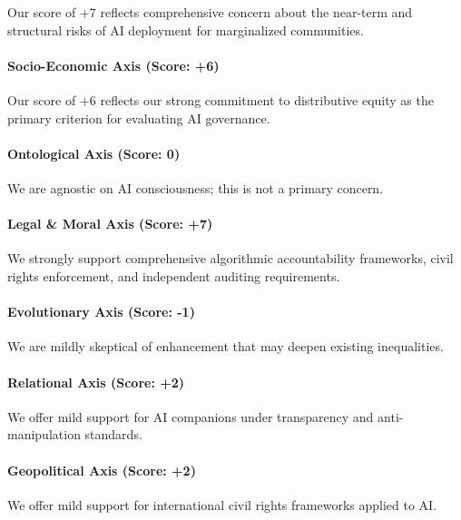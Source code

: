 Our score of +7 reflects comprehensive concern about the near-term and
structural risks of AI deployment for marginalized communities.

\paragraph{Socio-Economic Axis (Score:
+6)}\label{socio-economic-axis-score-6}

Our score of +6 reflects our strong commitment to distributive equity as
the primary criterion for evaluating AI governance.

\paragraph{Ontological Axis (Score:
0)}\label{ontological-axis-score-0-5}

We are agnostic on AI consciousness; this is not a primary concern.

\paragraph{Legal \& Moral Axis (Score:
+7)}\label{legal-moral-axis-score-7}

We strongly support comprehensive algorithmic accountability frameworks,
civil rights enforcement, and independent auditing requirements.

\paragraph{Evolutionary Axis (Score:
-1)}\label{evolutionary-axis-score--1-1}

We are mildly skeptical of enhancement that may deepen existing
inequalities.

\paragraph{Relational Axis (Score: +2)}\label{relational-axis-score-2-2}

We offer mild support for AI companions under transparency and
anti-manipulation standards.

\paragraph{Geopolitical Axis (Score:
+2)}\label{geopolitical-axis-score-2-1}

We offer mild support for international civil rights frameworks applied
to AI.

